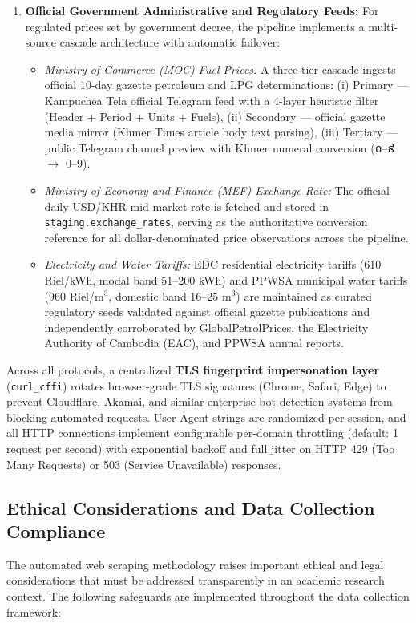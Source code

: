 \begin{enumerate}
    \item \textbf{Official Government Administrative and Regulatory Feeds:} For regulated prices set by government decree, the pipeline implements a multi-source cascade architecture with automatic failover:
    \begin{itemize}[noitemsep]
        \item \textit{Ministry of Commerce (MOC) Fuel Prices:} A three-tier cascade ingests official 10-day gazette petroleum and LPG determinations: (i) Primary --- Kampuchea Tela official Telegram feed with a 4-layer heuristic filter (Header + Period + Units + Fuels), (ii) Secondary --- official gazette media mirror (Khmer Times article body text parsing), (iii) Tertiary --- public Telegram channel preview with Khmer numeral conversion ({\khmerfont ០--៩} $\rightarrow$ 0--9).
        \item \textit{Ministry of Economy and Finance (MEF) Exchange Rate:} The official daily USD/KHR mid-market rate is fetched and stored in \texttt{staging.exchange\_rates}, serving as the authoritative conversion reference for all dollar-denominated price observations across the pipeline.
        \item \textit{Electricity and Water Tariffs:} EDC residential electricity tariffs (610 Riel/kWh, modal band 51--200 kWh) and PPWSA municipal water tariffs (960 Riel/m$^3$, domestic band 16--25 m$^3$) are maintained as curated regulatory seeds validated against official gazette publications and independently corroborated by GlobalPetrolPrices, the Electricity Authority of Cambodia (EAC), and PPWSA annual reports.
    \end{itemize}
\end{enumerate}

\hs Across all protocols, a centralized \textbf{TLS fingerprint impersonation layer} (\texttt{curl\_cffi}) rotates browser-grade TLS signatures (Chrome, Safari, Edge) to prevent Cloudflare, Akamai, and similar enterprise bot detection systems from blocking automated requests. User-Agent strings are randomized per session, and all HTTP connections implement configurable per-domain throttling (default: 1 request per second) with exponential backoff and full jitter on HTTP 429 (Too Many Requests) or 503 (Service Unavailable) responses.

\subsection{Ethical Considerations and Data Collection Compliance}
\hs The automated web scraping methodology raises important ethical and legal considerations that must be addressed transparently in an academic research context. The following safeguards are implemented throughout the data collection framework:

